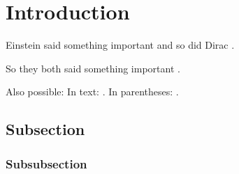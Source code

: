 \section{Introduction}




Einstein said something important \cite{einstein} and so did Dirac \cite{dirac}.

So they both said something important \cite{dirac,einstein}.

Also possible: In text: \citet{dirac}. In parentheses: \citep{dirac}.


\subsection{Subsection}
\subsubsection{Subsubsection}